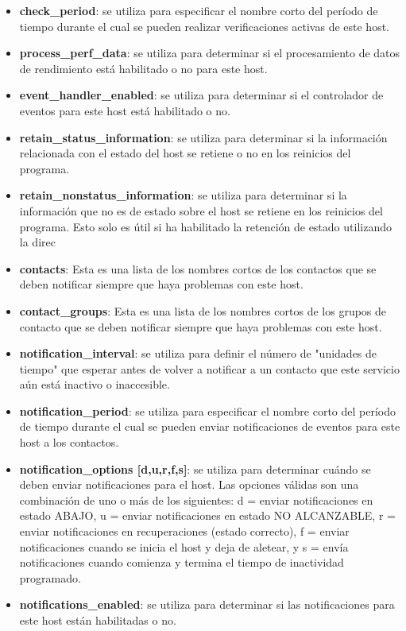 \begin{itemize}
	\item \textbf{check\_period}: se utiliza para especificar el nombre corto del período de tiempo durante el cual se pueden realizar verificaciones activas de este host.	
	\item \textbf{process\_perf\_data}: se utiliza para determinar si el procesamiento de datos de rendimiento está habilitado o no para este host.	
	\item \textbf{event\_handler\_enabled}:	se utiliza para determinar si el controlador de eventos para este host está habilitado o no. 
	\item \textbf{retain\_status\_information}: se utiliza para determinar si la información relacionada con el estado del host se retiene o no en los reinicios del programa.	
	\item \textbf{retain\_nonstatus\_information}: se utiliza para determinar si la información que no es de estado sobre el host se retiene en los reinicios del programa. Esto solo es útil si ha habilitado la retención de estado utilizando la direc	
	\item \textbf{contacts}: Esta es una lista de los nombres cortos de los contactos que se deben notificar siempre que haya problemas con este host.	
	\item \textbf{contact\_groups}: Esta es una lista de los nombres cortos de los grupos de contacto que se deben notificar siempre que haya problemas con este host.	
	\item \textbf{notification\_interval}: se utiliza para definir el número de "unidades de tiempo" que esperar antes de volver a notificar a un contacto que este servicio aún está inactivo o inaccesible.	
	\item \textbf{notification\_period}: se utiliza para especificar el nombre corto del período de tiempo durante el cual se pueden enviar notificaciones de eventos para este host a los contactos.	
	\item \textbf{notification\_options	[d,u,r,f,s]}: se utiliza para determinar cuándo se deben enviar notificaciones para el host. Las opciones válidas son una combinación de uno o más de los siguientes: d = enviar notificaciones en estado ABAJO, u = enviar notificaciones en estado NO ALCANZABLE, r = enviar notificaciones en recuperaciones (estado correcto), f = enviar notificaciones cuando se inicia el host y deja de aletear, y s = envía notificaciones cuando comienza y termina el tiempo de inactividad programado. 
	\item \textbf{notifications\_enabled}: se utiliza para determinar si las notificaciones para este host están habilitadas o no.	
\end{itemize}

